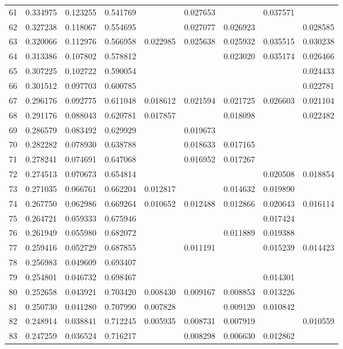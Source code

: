 \documentclass{elsarticle}
\begin{document}
\begin{center}
\begin{longtable}{|c|ccc|cccc|c|}
  61 & 0.334975 & 0.123255 & 0.541769 &  & 0.027653 &  & 0.037571 &  \\
  62 & 0.327238 & 0.118067 & 0.554695 &  & 0.027077 & 0.026923 &  & 0.028585 \\
  63 & 0.320066 & 0.112976 & 0.566958 & 0.022985 & 0.025638 & 0.025932 & 0.035515 & 0.030238 \\
  64 & 0.313386 & 0.107802 & 0.578812 &  &  & 0.023020 & 0.035174 & 0.026466 \\
  65 & 0.307225 & 0.102722 & 0.590054 &  &  &  &  & 0.024433 \\
  66 & 0.301512 & 0.097703 & 0.600785 &  &  &  &  & 0.022781 \\
  67 & 0.296176 & 0.092775 & 0.611048 & 0.018612 & 0.021594 & 0.021725 & 0.026603 & 0.021104 \\
  68 & 0.291176 & 0.088043 & 0.620781 & 0.017857 &  & 0.018098 &  & 0.022482 \\
  69 & 0.286579 & 0.083492 & 0.629929 &  & 0.019673 &  &  &  \\
  70 & 0.282282 & 0.078930 & 0.638788 &  & 0.018633 & 0.017165 &  &  \\
  71 & 0.278241 & 0.074691 & 0.647068 &  & 0.016952 & 0.017267 &  &  \\
  72 & 0.274513 & 0.070673 & 0.654814 &  &  &  & 0.020508 & 0.018854 \\
  73 & 0.271035 & 0.066761 & 0.662204 & 0.012817 &  & 0.014632 & 0.019890 &  \\
  74 & 0.267750 & 0.062986 & 0.669264 & 0.010652 & 0.012488 & 0.012866 & 0.020643 & 0.016114 \\
  75 & 0.264721 & 0.059333 & 0.675946 &  &  &  & 0.017424 &  \\
  76 & 0.261949 & 0.055980 & 0.682072 &  &  & 0.011889 & 0.019388 &  \\
  77 & 0.259416 & 0.052729 & 0.687855 &  & 0.011191 &  & 0.015239 & 0.014423 \\
  78 & 0.256983 & 0.049609 & 0.693407 &  &  &  &  &  \\
  79 & 0.254801 & 0.046732 & 0.698467 &  &  &  & 0.014301 &  \\
  80 & 0.252658 & 0.043921 & 0.703420 & 0.008430 & 0.009167 & 0.008853 & 0.013226 &  \\
  81 & 0.250730 & 0.041280 & 0.707990 & 0.007828 &  & 0.009120 & 0.010842 &  \\
  82 & 0.248914 & 0.038841 & 0.712245 & 0.005935 & 0.008731 & 0.007919 &  & 0.010559 \\
  83 & 0.247259 & 0.036524 & 0.716217 &  & 0.008298 & 0.006630 & 0.012862 &  \\

\end{longtable}
\end{center}
\end{document}
